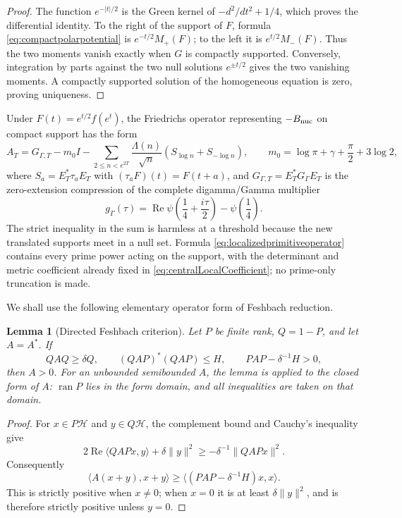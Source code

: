 \documentclass[11pt]{amsart}
\newtheorem{lemma}[theorem]{Lemma}
\theoremstyle{definition}
\theoremstyle{remark}
\begin{document}
\begin{proof}
The function \(e^{-|t|/2}\) is the Green kernel of
\(-d^2/dt^2+1/4\), which proves the differential identity.  To the right
of the support of \(F\), formula \eqref{eq:compactpolarpotential} is
\(e^{-t/2}M_+(F)\); to the left it is \(e^{t/2}M_-(F)\).  Thus the
two moments vanish exactly when \(G\) is compactly supported.  Conversely,
integration by parts against the two null solutions \(e^{\pm t/2}\) gives
the two vanishing moments.  A compactly supported solution of the
homogeneous equation is zero, proving uniqueness.
\end{proof}

Under \(F(t)=e^{t/2}f(e^t)\), the Friedrichs operator representing
\(-B_{\rm nuc}\) on compact support has the form
\begin{equation}\label{eq:localizedprimitiveoperator}
 A_T=G_{\Gamma,T}-m_0I-
 \sum_{2\le n<e^{2T}}\frac{\Lambda(n)}{\sqrt n}
       (S_{\log n}+S_{-\log n}),
 \qquad
 m_0=\log\pi+\gamma+\frac{\pi}{2}+3\log2,
\end{equation}
where \(S_a=E_T^*\tau_aE_T\) with \((\tau_aF)(t)=F(t+a)\), and
\(G_{\Gamma,T}=E_T^*G_\Gamma E_T\) is the zero-extension compression of the
complete digamma/Gamma multiplier
\[
 g_\Gamma(\tau)=\operatorname {Re}\psi
       \left(\frac14+\frac{i\tau}{2}\right)-\psi\left(\frac14\right).
\]
The strict inequality in the sum is harmless at a threshold because the
new translated supports meet in a null set.  Formula
\eqref{eq:localizedprimitiveoperator} contains every prime power acting on
the support, with the determinant and metric coefficient already fixed in
\eqref{eq:centralLocalCoefficient}; no prime-only truncation is made.

We shall use the following elementary operator form of Feshbach reduction.

\begin{lemma}[Directed Feshbach criterion]\label{lem:directedFeshbach}
Let \(P\) be finite rank, \(Q=1-P\), and let \(A=A^*\).  If
\begin{equation}\label{eq:directedFeshbachHypotheses}
 QAQ\ge\delta Q,\qquad
 (QAP)^*(QAP)\le H,\qquad
 PAP-\delta^{-1}H>0,
\end{equation}
then \(A>0\).  For an unbounded semibounded \(A\), the lemma is applied to
the closed form of \(A\): \(\operatorname{ran}P\) lies in the form domain,
and all inequalities are taken on that domain.
\end{lemma}

\begin{proof}
For \(x\in P\mathcal H\) and \(y\in Q\mathcal H\), the complement bound
and Cauchy's inequality give
\[
 2\operatorname{Re}\langle QAPx,y\rangle+\delta\|y\|^2
 \ge-\delta^{-1}\|QAPx\|^2.
\]
Consequently
\[
 \langle A(x+y),x+y\rangle
 \ge \langle(PAP-\delta^{-1}H)x,x\rangle.
\]
This is strictly positive when \(x\ne0\); when \(x=0\) it is at least
\(\delta\|y\|^2\), and is therefore strictly positive unless \(y=0\).
\end{proof}
\end{document}
